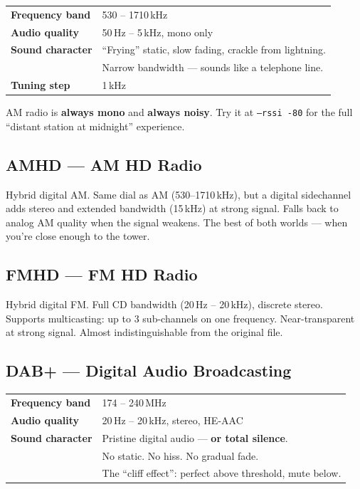 \documentclass[11pt,a4paper]{article}
\newcommand{\cmd}[1]{\textcolor{radioDark}{\texttt{#1}}}
\begin{document}
\begin{tabularx}{\textwidth}{@{}>{\raggedright\arraybackslash}p{4.5cm} X@{}}
    \textbf{Frequency band}  & 530 -- 1710\,kHz \\
    \textbf{Audio quality}   & 50\,Hz -- 5\,kHz, mono only \\
    \textbf{Sound character} & ``Frying'' static, slow fading, crackle from lightning. \\
                             & Narrow bandwidth --- sounds like a telephone line. \\
    \textbf{Tuning step}     & 1\,kHz \\
\end{tabularx}
\vspace{1mm}

\begin{warnbox}
    AM radio is \textbf{always mono} and \textbf{always noisy}.
    Try it at \cmd{--rssi -80} for the full ``distant station at midnight'' experience.
\end{warnbox}

\subsection*{\textcolor{radioYellow}{\textbf{AMHD} --- AM HD Radio}}
Hybrid digital AM. Same dial as AM (530--1710\,kHz), but a digital sidechannel
adds stereo and extended bandwidth (15\,kHz) at strong signal. Falls back to
analog AM quality when the signal weakens. The best of both worlds --- when
you're close enough to the tower.

\subsection*{\textcolor{radioGreen}{\textbf{FMHD} --- FM HD Radio}}
Hybrid digital FM. Full CD bandwidth (20\,Hz -- 20\,kHz), discrete stereo.
Supports multicasting: up to 3 sub-channels on one frequency. Near-transparent
at strong signal. Almost indistinguishable from the original file.

\subsection*{\textcolor{radioCyan}{\textbf{DAB+} --- Digital Audio Broadcasting}}

\begin{tabularx}{\textwidth}{@{}>{\raggedright\arraybackslash}p{4.5cm} X@{}}
    \textbf{Frequency band}  & 174 -- 240\,MHz \\
    \textbf{Audio quality}   & 20\,Hz -- 20\,kHz, stereo, HE-AAC \\
    \textbf{Sound character} & Pristine digital audio --- \textbf{or total silence}. \\
                             & No static. No hiss. No gradual fade. \\
                             & The ``cliff effect'': perfect above threshold, mute below. \\
\end{tabularx}
\end{document}
